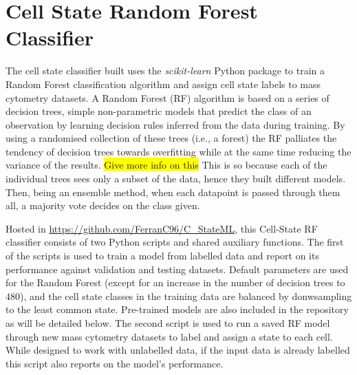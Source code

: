 

\section{Cell State Random Forest Classifier}

The cell state classifier built uses the \emph{scikit-learn} Python package \cite{pedregosa_scikit-learn_2011} to train a Random Forest classification algorithm and assign cell state labels to mass cytometry datasets. A Random Forest (RF) algorithm is based on a series of decision trees, simple non-parametric models that predict the class of an observation by learning decision rules inferred from the data during training. By using a randomised collection of these trees (i.e., a forest) the RF palliates the tendency of decision trees towards overfitting while at the same time reducing the variance of the results. \colorbox{yellow}{Give more info on this} This is so because each of the individual trees sees only a subset of the data, hence they built different models. Then, being an ensemble method, when each datapoint is passed through them all, a majority vote decides on the class given.

Hosted in \url{https://github.com/FerranC96/C\_StateML}, this Cell-State RF classifier consists of two Python scripts and shared auxiliary functions. 
The first of the scripts is used to train a model from labelled data and report on its performance against validation and testing datasets. Default parameters are used for the Random Forest (except for an increase in the number of decision trees to 480), and the cell state classes in the training data are balanced by donwsampling to the least common state. Pre-trained models are also included in the repository as will be detailed below.
The second script is used to run a saved RF model through new mass cytometry datasets to label and assign a state to each cell. While designed to work with unlabelled data, if the input data is already labelled this script also reports on the model's performance. 

